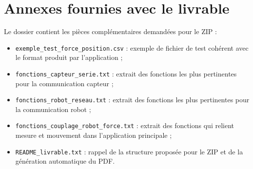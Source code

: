 \documentclass[11pt,a4paper]{article}
\begin{document}
\section{Annexes fournies avec le livrable}
\label{ann:livrables}
Le dossier  contient les pi\`eces compl\'ementaires demand\'ees pour le ZIP :
\begin{itemize}
  \item \texttt{exemple\_test\_force\_position.csv} : exemple de fichier de test coh\'erent avec le format produit par l'application ;
  \item \texttt{fonctions\_capteur\_serie.txt} : extrait des fonctions les plus pertinentes pour la communication capteur ;
  \item \texttt{fonctions\_robot\_reseau.txt} : extrait des fonctions les plus pertinentes pour la communication robot ;
  \item \texttt{fonctions\_couplage\_robot\_force.txt} : extrait des fonctions qui relient mesure et mouvement dans l'application principale ;
  \item \texttt{README\_livrable.txt} : rappel de la structure propos\'ee pour le ZIP et de la g\'en\'eration automatique du PDF.
\end{itemize}
\end{document}
